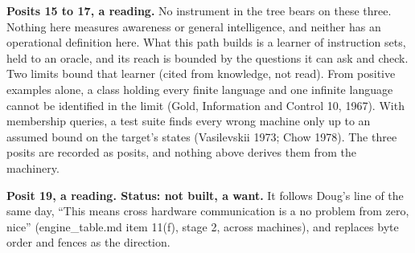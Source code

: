 \textbf{Posits 15 to 17, a reading.} No instrument in the tree bears on these three. Nothing here measures awareness or general intelligence, and neither has an operational definition here. What this path builds is a learner of instruction sets, held to an oracle, and its reach is bounded by the questions it can ask and check. Two limits bound that learner (cited from knowledge, not read). From positive examples alone, a class holding every finite language and one infinite language cannot be identified in the limit (Gold, Information and Control 10, 1967). With membership queries, a test suite finds every wrong machine only up to an assumed bound on the target's states (Vasilevskii 1973; Chow 1978). The three posits are recorded as posits, and nothing above derives them from the machinery.

\textbf{Posit 19, a reading. Status: not built, a want.} It follows Doug's line of the same day, “This means cross hardware communication is a no problem from zero, nice” (engine\_\allowbreak{}table.md item 11(f), stage 2, across machines), and replaces byte order and fences as the direction.

